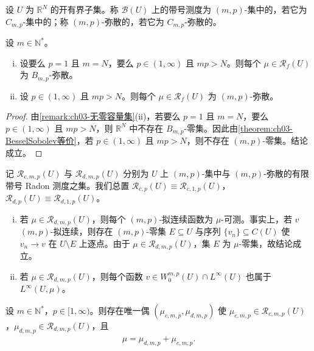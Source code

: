 \documentclass[../../main.tex]{subfiles}%
\begin{document}
设 $U$ 为 $\mathbb{R}^N$ 的开有界子集。称 $\mathcal{B}(U)$ 上的带号测度为 $(m,p)$-集中的，若它为 $C_{m,p}$-集中的；称 $(m,p)$-弥散的，若它为 $C_{m,p}$-弥散的。

\begin{proposition}\label{proposition:ch03-无非平凡集中}
设 $m\in\mathbb{N}^*$。
\begin{enumerate}[(i)]
\item 设要么 $p=1$ 且 $m=N$，要么 $p\in(1,\infty)$ 且 $mp>N$。则每个 $\mu\in\mathscr{R}_f(U)$ 为 $B_{m,p}$-弥散。
\item 设 $p\in(1,\infty)$ 且 $mp>N$。则每个 $\mu\in\mathscr{R}_f(U)$ 为 $(m,p)$-弥散。
\end{enumerate}
\end{proposition}

\begin{proof}
由\cref{remark:ch03-无零容量集}(ii)，若要么 $p=1$ 且 $m=N$，要么 $p\in(1,\infty)$ 且 $mp>N$，则 $\mathbb{R}^N$ 中不存在 $B_{m,p}$-零集。因此由\cref{theorem:ch03-BesselSobolev等价}，若 $p\in(1,\infty)$ 且 $mp>N$，则不存在 $(m,p)$-零集。结论成立。
\end{proof}

记 $\mathscr{R}_{c,m,p}(U)$ 与 $\mathscr{R}_{d,m,p}(U)$ 分别为 $U$ 上 $(m,p)$-集中与 $(m,p)$-弥散的有限带号 Radon 测度之集。我们总置 $\mathscr{R}_{c,p}(U)\equiv\mathscr{R}_{c,1,p}(U)$，$\mathscr{R}_{d,p}(U)\equiv\mathscr{R}_{d,1,p}(U)$。

\begin{remark}\label{remark:ch03-弥散测度性质}
\begin{enumerate}[(i)]
\item 若 $\mu\in\mathscr{R}_{d,m,p}(U)$，则每个 $(m,p)$-拟连续函数为 $\mu$-可测。事实上，若 $v$ $(m,p)$-拟连续，则存在 $(m,p)$-零集 $E\subseteq U$ 与序列 $\{v_n\}\subseteq C(U)$ 使 $v_n\to v$ 在 $U\setminus E$ 上逐点。由于 $\mu\in\mathscr{R}_{d,m,p}(U)$，集 $E$ 为 $\mu$-零集，故结论成立。
\item 若 $\mu\in\mathscr{R}_{d,m,p}(U)$，则每个函数 $v\in W^{m,p}_0(U)\cap L^\infty(U)$ 也属于 $L^\infty(U,\mu)$。
\end{enumerate}
\end{remark}

\begin{proposition}\label{proposition:ch03-集中弥散分解}
设 $m\in\mathbb{N}^*$，$p\in[1,\infty)$。则存在唯一偶 $(\mu_{c,m,p},\mu_{d,m,p})$ 使 $\mu_{c,m,p}\in\mathscr{R}_{c,m,p}(U)$，$\mu_{d,m,p}\in\mathscr{R}_{d,m,p}(U)$，且
\begin{align}
\mu=\mu_{d,m,p}+\mu_{c,m,p}.\label{align:ch03-3.78}
\end{align}
\end{proposition}
\end{document}
